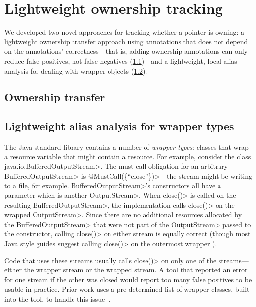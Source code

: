 \section{Lightweight ownership tracking}
\label{sec:lightweight-ownership}

We developed two novel approaches for tracking whether a pointer is
owning: a lightweight ownership transfer approach using annotations
that does not depend on the annotations' correctness---that is, adding
ownership annotations can only reduce false positives, not false
negatives (\cref{sec:ownership-transfer})---and a lightweight, local
alias analysis for dealing with wrapper objects
(\cref{sec:must-call-choice}).

\subsection{Ownership transfer}
\label{sec:ownership-transfer}


\subsection{Lightweight alias analysis for wrapper types}
\label{sec:must-call-choice}

The Java standard library contains a number of \emph{wrapper types}:
classes that wrap a resource variable that might contain a resource.
For example, consider the class \<java.io.BufferedOutputStream>.  The
must-call obligation for an arbitrary \<BufferedOutputStream> is
\<@MustCall(\{``close''\})>---the stream might be writing to a file,
for example.  \<BufferedOutputStream>'s constructors all have a
parameter which is another \<OutputStream>. When \<close()> is called
on the resulting \<BufferedOutputStream>, the implementation calls
\<close()> on the wrapped \<OutputStream>. Since there are no
additional resources allocated by the \<BufferedOutputStream> that
were not part of the \<OutputStream> passed to the constructor,
calling \<close()> on either stream is equally correct (though most
Java style guides suggest calling \<close()> on the outermost
wrapper ).

Code that uses these streams usually calls \<close()> on only one
of the streams---either the wrapper stream or the wrapped stream.
A tool that reported an error for one stream if the other was closed
would report too many false positives to be usable in practice.
Prior work uses a pre-determined list of wrapper classes, built into
the tool, to handle this issue~\cite{TorlakC10}. 

